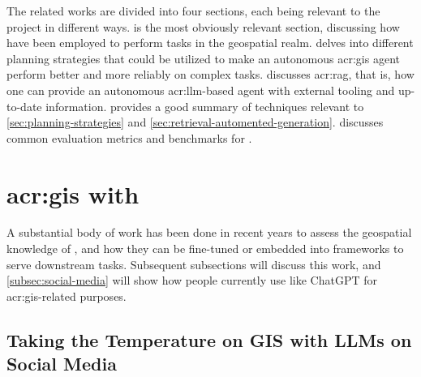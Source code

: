 The related works are divided into four sections, each being relevant to the project in different ways.  is the most obviously relevant section, discussing how  have been employed to perform tasks in the geospatial realm.  delves into different planning strategies that could be utilized to make an autonomous \acrshort{acr:gis} agent perform better and more reliably on complex tasks.  discusses \gls{acr:rag}, that is, how one can provide an autonomous \acrshort{acr:llm}-based agent with external tooling and up-to-date information. \cite{wengLLMPoweredAutonomous2023} provides a good summary of techniques relevant to \autoref{sec:planning-strategies} and \autoref{sec:retrieval-automented-generation}.  discusses common evaluation metrics and benchmarks for .



\section[GIS with LLMs]{\acrshort{acr:gis} with }\label{sec:gis-with-llms}

A substantial body of work has been done in recent years to assess the geospatial knowledge of , and how they can be fine-tuned or embedded into frameworks to serve downstream tasks. Subsequent subsections will discuss this work, and \autoref{subsec:social-media} will show how people currently use  like ChatGPT for \acrshort{acr:gis}-related purposes.

\subsection{Taking the Temperature on GIS with LLMs on Social Media}\label{subsec:social-media}

